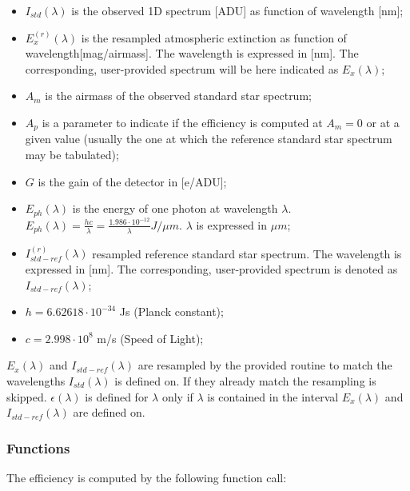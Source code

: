 \begin{itemize}

\item $I_{std}(\lambda)$ is the observed 1D spectrum [ADU] as function of wavelength [nm];

\item  $E_x^{(r)}(\lambda)$ is the resampled atmospheric extinction as function of wavelength[mag/airmass]. The wavelength is expressed in [nm]. The corresponding, user-provided spectrum will be here indicated as $E_x(\lambda)$;

\item $A_m$ is the airmass of the observed standard star spectrum;

\item $A_p$ is a parameter to indicate if the efficiency is computed at $A_m=0$ or at a given value (usually the one at which the reference standard star spectrum may be tabulated);

\item $G$ is the gain  of the detector in [e/ADU];

\item $E_{ph}(\lambda)$ is the energy of one photon at wavelength $\lambda$. $E_{ph}(\lambda)=\frac{hc}{\lambda} = \frac{1.986\cdot{}10^{-12}}{\lambda }J/{\mu}m$. $\lambda$ is expressed in ${\mu}m$;

\item $I_{std-ref}^{(r)}(\lambda)$ resampled reference standard star spectrum. The wavelength is expressed in [nm]. The corresponding, user-provided spectrum is denoted as $I_{std-ref}(\lambda)$; 

\item $h = 6.62618\cdot 10^{-34}$ Js (Planck constant);

\item $c = 2.998\cdot 10^8$ m/s (Speed of Light);

\end{itemize} 

$E_x(\lambda)$  and $I_{std-ref}(\lambda)$ are resampled by the provided routine to match the wavelengths $I_{std}(\lambda)$ is defined on. If they already match the resampling is skipped.  $\epsilon(\lambda)$ is defined for $\lambda$ only if $\lambda$ is contained in the interval $E_x(\lambda)$  and $I_{std-ref}(\lambda)$ are defined on. 

\subsubsection{Functions}
The efficiency is computed by the following function call:

